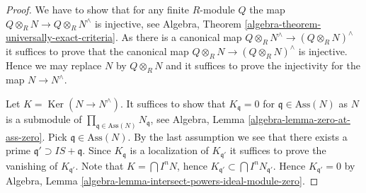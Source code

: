 \documentclass[10pt,a4paper]{amsart}
\theoremstyle{plain}
\theoremstyle{definition}
\theoremstyle{remark}
\numberwithin{equation}{subsection}
\def\Ker{\mathop{\mathrm{Ker}}}
\begin{document}
\begin{proof}
We have to show that for any finite $R$-module $Q$ the map
$Q \otimes_R N \to Q \otimes_R N^\wedge$ is injective, see
Algebra, Theorem \ref{algebra-theorem-universally-exact-criteria}.
As there is a canonical map $Q \otimes_R N^\wedge \to (Q \otimes_R N)^\wedge$
it suffices to prove that the canonical map
$Q \otimes_R N \to (Q \otimes_R N)^\wedge$ is injective.
Hence we may replace $N$ by $Q \otimes_R N$ and it suffices to prove the
injectivity for the map $N \to N^\wedge$.

\medskip\noindent
Let $K = \Ker(N \to N^\wedge)$. It suffices to show that
$K_{\mathfrak q} = 0$ for $\mathfrak q \in \text{Ass}(N)$ as $N$ is a
submodule of $\prod_{\mathfrak q \in \text{Ass}(N)} N_{\mathfrak q}$, see
Algebra, Lemma \ref{algebra-lemma-zero-at-ass-zero}.
Pick $\mathfrak q \in \text{Ass}(N)$. By the last assumption we see that
there exists a prime $\mathfrak q' \supset IS + \mathfrak q$.
Since $K_{\mathfrak q}$ is a localization of $K_{\mathfrak q'}$
it suffices to prove the vanishing of $K_{\mathfrak q'}$.
Note that $K = \bigcap I^nN$, hence
$K_{\mathfrak q'} \subset \bigcap I^nN_{\mathfrak q'}$.
Hence $K_{\mathfrak q'} = 0$ by
Algebra, Lemma \ref{algebra-lemma-intersect-powers-ideal-module-zero}.
\end{proof}
\end{document}
